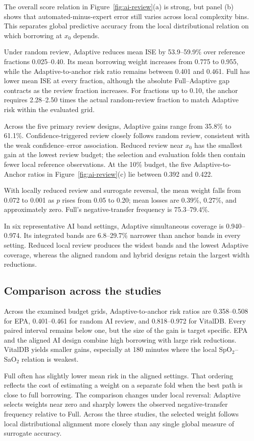 The overall score relation in Figure~\ref{fig:ai-review}(a) is strong, but
panel (b) shows that automated-minus-expert error still varies across local
complexity bins. This separates global predictive accuracy from the local
distributional relation on which borrowing at \(x_0\) depends.

Under random review, Adaptive reduces mean ISE by 53.9--59.9\% over reference
fractions 0.025--0.40. Its mean borrowing weight increases from 0.775 to 0.955,
while the Adaptive-to-anchor risk ratio remains between 0.401 and 0.461. Full
has lower mean ISE at every fraction, although the absolute Full--Adaptive gap
contracts as the review fraction increases. For fractions up to 0.10, the
anchor requires 2.28--2.50 times the actual random-review fraction to match
Adaptive risk within the evaluated grid.

Across the five primary review designs, Adaptive gains range from 35.8\% to
61.1\%. Confidence-triggered review closely follows random review, consistent
with the weak confidence--error association. Reduced review near \(x_0\) has
the smallest gain at the lowest review budget; the selection and evaluation
folds then contain fewer local reference observations. At the 10\% budget,
the five Adaptive-to-Anchor ratios in Figure~\ref{fig:ai-review}(c) lie between
0.392 and 0.422.

With locally reduced review and surrogate reversal, the mean weight falls from
0.072 to 0.001 as \(p\) rises from 0.05 to 0.20; mean losses are 0.39\%, 0.27\%,
and approximately zero. Full's negative-transfer frequency is 75.3--79.4\%.

In six representative AI band settings, Adaptive simultaneous coverage is
0.940--0.974. Its integrated bands are 6.8--29.7\% narrower than anchor bands
in every setting. Reduced local review produces the widest bands and the lowest
Adaptive coverage, whereas the aligned random and hybrid designs retain the
largest width reductions.

\subsection{Comparison across the studies}

Across the examined budget grids, Adaptive-to-anchor risk ratios are
0.358--0.508 for EPA, 0.401--0.461 for random AI review, and 0.818--0.972 for
VitalDB. Every paired interval remains below one, but the size of the gain is
target specific. EPA and the aligned AI design combine high borrowing with
large risk reductions. VitalDB yields smaller gains, especially at 180 minutes
where the local SpO\(_2\)--SaO\(_2\) relation is weakest.

Full often has slightly lower mean risk in the aligned settings. That ordering
reflects the cost of estimating a weight on a separate fold when the best path
is close to full borrowing. The comparison changes under local reversal:
Adaptive selects weights near zero and sharply lowers the observed
negative-transfer frequency relative to Full. Across the three studies, the
selected weight follows local distributional alignment more closely than any
single global measure of surrogate accuracy.
